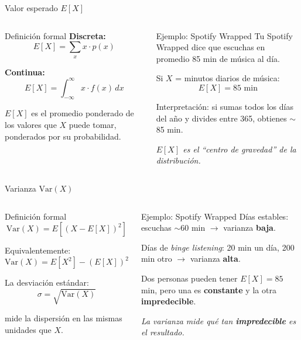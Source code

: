 \documentclass[aspectratio=169, 11pt]{beamer}
\begin{document}
\begin{frame}{Valor esperado $E[X]$}
\begin{columns}[T]
\begin{block}{Definici\'on formal}
\textbf{Discreta:}
\[
  E[X] = \sum_{x} x \cdot p(x)
\]

\textbf{Continua:}
\[
  E[X] = \int_{-\infty}^{\infty} x \cdot f(x)\,dx
\]

\vspace{0.3em}
$E[X]$ es el \alert{promedio ponderado} de los valores que $X$ puede tomar, ponderados por su probabilidad.
\end{block}

\begin{exampleblock}{Ejemplo: Spotify Wrapped}
Tu Spotify Wrapped dice que escuchas en promedio 85 min de m\'usica al d\'ia.

\vspace{0.3em}
Si $X$ = minutos diarios de m\'usica:
\[
  E[X] = 85 \text{ min}
\]

\vspace{0.3em}
Interpretaci\'on: si sumas todos los d\'ias del a\~no y divides entre 365, obtienes $\sim$85 min.

\vspace{0.5em}
\textit{$E[X]$ es el ``centro de gravedad'' de la distribuci\'on.}
\end{exampleblock}
\end{columns}
\end{frame}

\begin{frame}{Varianza $\text{Var}(X)$}
\begin{columns}[T]
\begin{block}{Definici\'on formal}
\[
  \text{Var}(X) = E\!\left[(X - E[X])^2\right]
\]

Equivalentemente:
\[
  \text{Var}(X) = E[X^2] - (E[X])^2
\]

\vspace{0.3em}
La \alert{desviaci\'on est\'andar}:
\[
  \sigma = \sqrt{\text{Var}(X)}
\]

mide la dispersi\'on en las mismas unidades que $X$.
\end{block}

\begin{exampleblock}{Ejemplo: Spotify Wrapped}
D\'ias estables: escuchas $\sim$60 min $\to$ varianza \textbf{baja}.

\vspace{0.3em}
D\'ias de \textit{binge listening}: 20 min un d\'ia, 200 min otro $\to$ varianza \textbf{alta}.

\vspace{0.3em}
Dos personas pueden tener $E[X] = 85$ min, pero una es \textbf{constante} y la otra \textbf{impredecible}.

\vspace{0.5em}
\textit{La varianza mide qu\'e tan \textbf{impredecible} es el resultado.}
\end{exampleblock}
\end{columns}
\end{frame}
\end{document}
